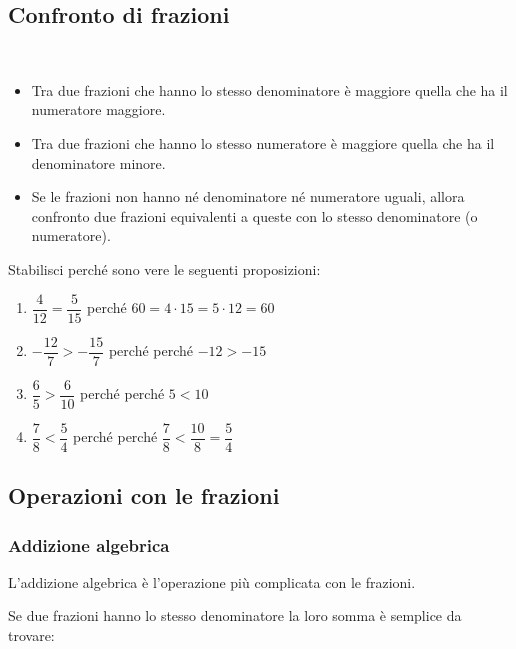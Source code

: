 \subsection{Confronto di frazioni}
\label{sub:razionali_confronto}

\begin{definizione}
~

\begin{itemize}
 \item Tra due frazioni che hanno lo stesso denominatore è maggiore quella 
che ha il numeratore maggiore.
 \item Tra due frazioni che hanno lo stesso numeratore è maggiore quella 
che ha il denominatore minore.
 \item Se le frazioni non hanno né denominatore né numeratore uguali, 
allora confronto due frazioni equivalenti a queste con lo stesso 
denominatore (o numeratore).
\end{itemize}
\end{definizione}

\begin{esempio}
 Stabilisci perché sono vere le seguenti proposizioni:
 \begin{enumerate} [noitemsep]
  \item \(\dfrac{4}{12} = \dfrac{5}{15}\)
    \qquad perché \quad \(60 = 4 \cdot 15 = 5 \cdot 12 = 60\)
  \item \(-\dfrac{12}{7} > -\dfrac{15}{7}\)
    \qquad perché \quad perché \(-12 > -15\)
  \item \(\dfrac{6}{5} > \dfrac{6}{10}\)
    \qquad perché \quad perché \(5 < 10\)
  \item \(\dfrac{7}{8} < \dfrac{5}{4}\)
    \qquad perché \quad perché \(\dfrac{7}{8} < \dfrac{10}{8} = 
\dfrac{5}{4}\)
 \end{enumerate}
\end{esempio}

\subsection{Operazioni con le frazioni}
\label{sub:razionali_operazioni}

\subsubsection{Addizione algebrica}

L'addizione algebrica è l'operazione più complicata con le frazioni.

Se due frazioni hanno lo stesso denominatore la loro somma è semplice da 
trovare:

